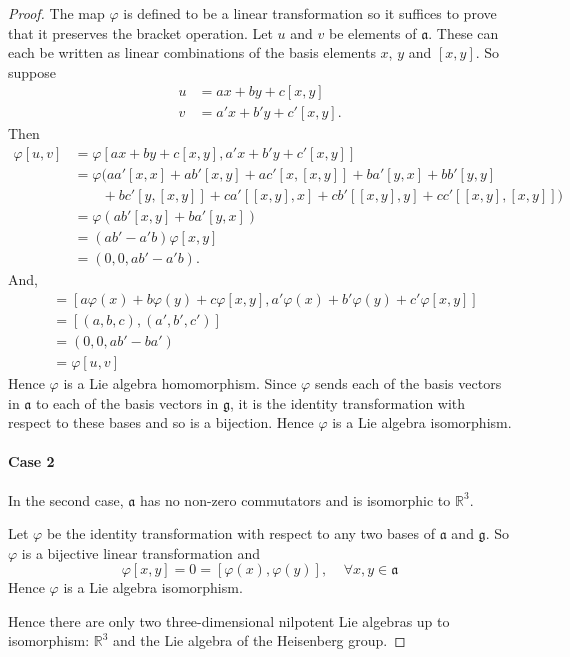 \documentclass[honours]{UNSWthesis}
\newcommand{\R}{\mathbb{R}}
\newcommand{\g}{\mathfrak{g}}
\newcommand{\1}{\mathbf{e}_{1}}
\newcommand{\2}{\mathbf{e}_{3}}
\newcommand{\3}{\mathbf{e}_{3}}
\begin{document}
\begin{proof}
The map $\varphi$ is defined to be a linear transformation so it suffices to prove that it preserves the bracket operation.
Let $u$ and $v$ be elements of $\mathfrak{a}$. These can each be written as linear combinations of the basis elements $x$, $y$ and $[x,y]$. So suppose
\begin{align*}
u &=ax+by+c[x,y] \\
v &=a'x+b'y+c'[x,y].
\end{align*}
Then
\begin{align*}
\varphi[u,v] &= \varphi [ax+by+c[x,y],a'x+b'y+c'[x,y]] \\
&=\varphi(aa'[x,x]+ab'[x,y]+ac'[x,[x,y]]+ba'[y,x]+bb'[y,y] \\
&\quad \quad+bc'[y,[x,y]]+ca'[[x,y],x]+cb'[[x,y],y]+cc'[[x,y],[x,y]])\\
&=\varphi(ab'[x,y]+ba'[y,x]) \\
&=(ab'-a'b)\varphi[x,y] \\
&=(0,0,ab'-a'b).
\end{align*}
And,
\begin{align*}
[\varphi(u),\varphi(v)] &=[a\varphi(x)+b\varphi(y)+c\varphi[x,y],a'\varphi(x)+b'\varphi(y)+c'\varphi[x,y]]\\
&=[(a,b,c),(a',b',c')]\\
&=(0,0,ab'-ba')\\
&=\varphi[u,v] 
\end{align*}
Hence $\varphi$ is a Lie algebra homomorphism. Since $\varphi$ sends each of the basis vectors in $\mathfrak{a}$ to each of the basis vectors in $\g$, it is the identity transformation with respect to these bases and so is a bijection. Hence $\varphi$ is a Lie algebra isomorphism.


\paragraph*{Case 2} In the second case, $\mathfrak{a}$ has no non-zero commutators and is isomorphic to $\R^{3}$. 

Let $\varphi$ be the identity transformation with respect to any two bases of $\mathfrak{a}$ and $\g$. So $\varphi$ is a bijective linear transformation and 
\[
\varphi[x,y]=0=[\varphi(x),\varphi(y)], \;\;\;\; \forall x,y \in \mathfrak{a}
\]
Hence $\varphi$ is a Lie algebra isomorphism.

Hence there are only two three-dimensional nilpotent Lie algebras up to isomorphism: $\R^{3}$ and the Lie algebra of the Heisenberg group.
\end{proof}
\end{document}
